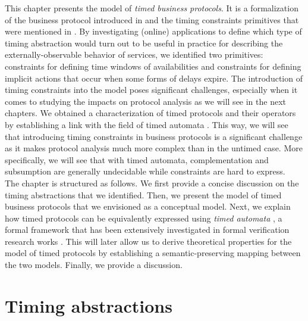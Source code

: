 
This chapter presents the model of \emph{timed business protocols}. It is a formalization of the business protocol introduced in \cite{FTBB} and the timing constraints primitives that were mentioned in \cite{BBFC04,BCT-CAISE03}. By investigating (online) applications to define which type of timing abstraction would turn out to be useful in practice for describing the externally-observable behavior of services, we identified two primitives: \CInvoke constraints for defining time windows of availabilities and \MInvoke constraints for defining implicit actions that occur when some forms of delays expire. The introduction of timing constraints into the model poses significant challenges, especially when it comes to studying the impacts on protocol analysis as we will see in the next chapters. We obtained a characterization of timed protocols and their operators by establishing a link with the field of timed automata \cite{RADLD94}. This way, we will see that introducing timing constraints in business protocols is a significant challenge as it makes protocol analysis much more complex than in the untimed case. More specifically, we will see that with timed automata, complementation and subsumption are generally undecidable while \MInvoke constraints are hard to express. \\

The chapter is structured as follows. We first provide a concise discussion on the timing abstractions that we identified. Then, we present the model of timed business protocols that we envisioned as a conceptual model. Next, we explain how timed protocols can be equivalently expressed using \emph{timed automata} \cite{RADLD94}, a formal framework that has been extensively investigated in formal verification research works \cite{RAPM04,UPPAAL}. This will later allow us to derive theoretical properties for the model of timed protocols by establishing a semantic-preserving mapping between the two models. Finally, we provide a discussion.


\section{Timing abstractions}


